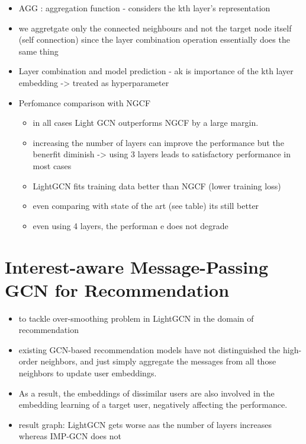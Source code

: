 \documentclass{report}
\begin{document}
\begin{itemize}
    \item AGG : aggregation function - considers the kth layer's representation 
    \item we aggretgate only the connected neighbours and not the target node itself (self connection) since the layer combination operation essentially does the same thing
    \item Layer combination and model prediction - ak is importance of the kth layer embedding -> treated as hyperparameter
    \item Perfomance comparison with NGCF
    \begin{itemize}
        \item in all cases Light GCN outperforms NGCF by a large margin.
        \item increasing the number of layers can improve the performance but the benerfit diminish -> using 3 layers leads to satisfactory performance in most cases
        \item LightGCN fits training data better than NGCF (lower training loss)
        \item  even comparing with state of the art (see table) its still better
        \item even using 4 layers, the performan e does not degrade
    \end{itemize}
\end{itemize}
 \section{Interest-aware Message-Passing GCN for Recommendation}
 \begin{itemize}
    \item to tackle over-smoothing problem in LightGCN in the domain of recommendation
    \item existing GCN-based recommendation models have not distinguished the high-order neighbors, and just simply aggregate the messages from all those neighbors to update user embeddings. 
    \item As a result, the embeddings of dissimilar users are also involved in the embedding learning of a target user, negatively affecting the performance.
    \item result graph: LightGCN gets worse aas the number of layers increases whereas IMP-GCN does not
 \end{itemize}
\end{document}
